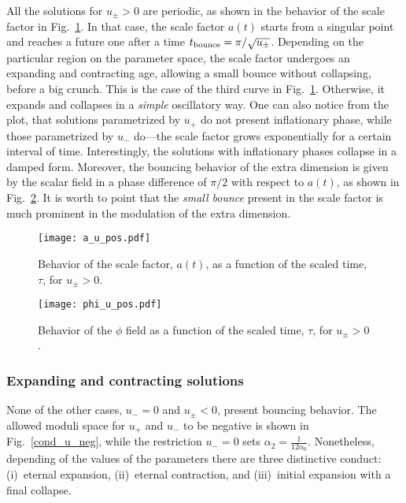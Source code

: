 \documentclass[aps,prd,12pt,superscriptaddress,showpacs,showkeys,longbibliography,reprint,nofootinbib]{revtex4-1}
\begin{document}
All the solutions for $u_\pm>0$ are periodic, as shown in the behavior of the scale factor in Fig.~\ref{a_u_pos}. In that case, the scale factor $a(t)$ starts from a singular point and reaches a future one after a time $t_{\rm bounce}=\pi/\sqrt{u_\pm}$.
Depending on the particular region on the parameter space, the scale factor undergoes an expanding and contracting age, allowing a small bounce without collapsing, before a big crunch. This is the case of the third curve in Fig.~\ref{a_u_pos}.
Otherwise, it expands and collapses in a \emph{simple} oscillatory way. One can also notice from the plot, that solutions parametrized by $u_+$ do not present inflationary phase, while those parametrized by $u_-$ do---the scale factor grows exponentially for a certain interval of time. Interestingly, the solutions with inflationary phases collapse in a damped form. Moreover, the bouncing behavior of the extra dimension is given by the scalar field in a phase difference of $\pi/2$ with respect to $a(t)$, as shown in Fig.~\ref{phi_u_pos}. It is worth to point that the \emph{small bounce} present in the scale factor is much prominent in the modulation of the extra dimension.
\begin{figure}[H]
  \texttt{[image: a\_u\_pos.pdf]}
  \caption{Behavior of the scale factor, \(a(t)\), as a function of the scaled time, $\tau$, for $u_\pm > 0$.}
  \label{a_u_pos}
\end{figure}
\begin{figure}[H]
  \texttt{[image: phi\_u\_pos.pdf]}
  \caption{Behavior of the $\phi$ field as a function of the scaled time, $\tau$, for $u_\pm > 0$.}
  \label{phi_u_pos}
\end{figure}

\subsubsection{Expanding and contracting solutions}

None of the other cases, $u_- = 0$ and $u_\pm < 0$, present bouncing behavior.
The allowed moduli space for $u_+$ and $u_-$ to be negative is shown in Fig.~\ref{cond_u_neg}, while the restriction $u_- = 0$ sets $\alpha_2 = \tfrac{1}{12 \alpha_0}$.
Nonetheless, depending of the values of the parameters there are three distinctive conduct: (i)~eternal expansion, (ii)~eternal contraction, and (iii)~initial expansion with a final collapse.
\end{document}
